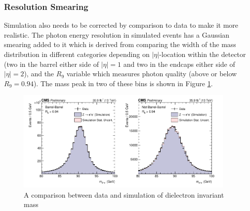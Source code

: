 \subsubsection{Resolution Smearing}
Simulation also needs to be corrected by comparison to data to make it more realistic. The photon energy resolution in simulated events has a Gaussian smearing added to it which is derived from comparing the width of the \Zee mass distribution in different categories depending on $|\eta|$-location within the detector (two in the barrel either side of $|\eta|=1$ and two in the endcaps either side of $|\eta|=2$), and the $R_{9}$ variable which measures photon quality (above or below $R_{9}=0.94$).
The mass peak in two of these bins is shown in Figure \ref{fig:object_reco:invariant_mass_validation}.
\begin{figure}[h!]
    \includegraphics[width=0.95\textwidth]{figures/object_reco/CMS-PAS-HIG-16-040_Figure_001.pdf}
    \caption{A comparison between data and simulation of dielectron invariant mass}
        \label{fig:object_reco:invariant_mass_validation}
\end{figure}

